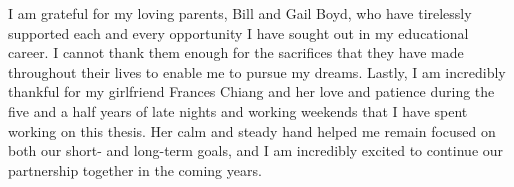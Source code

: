 I am grateful for my loving parents, Bill and Gail Boyd, who have tirelessly supported each and every opportunity I have sought out in my educational career. I cannot thank them enough for the sacrifices that they have made throughout their lives to enable me to pursue my dreams. Lastly, I am incredibly thankful for my girlfriend Frances Chiang and her love and patience during the five and a half years of late nights and working weekends that I have spent working on this thesis. Her calm and steady hand helped me remain focused on both our short- and long-term goals, and I am incredibly excited to continue our partnership together in the coming years.

